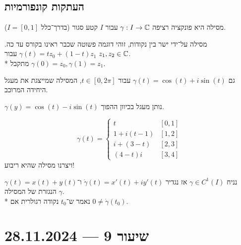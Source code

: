 \subsection{העתקות קונפורמיות}
\begin{definition}
	מסילה היא פונקציה רציפה $\gamma : I \to \mathbb{C}$ עבור $I$ קטע סגור (בדרך־כלל $I = [0, 1]$).
\end{definition}
\begin{example}
	מסילה על־ידי ישר בין נקודות, זוהי דוגמה פשוטה שכבר ראינו בקורס עד כה.
	$\gamma(t) = tz_0 + (1 - t)z_1$ עבור $z_1, z_2 \in \mathbb{C}$. \\*
	מתקבל $\gamma(0) = z_0, \gamma(1) = z_1$.
\end{example}
\begin{example}
	גם $\gamma(t) = \cos(t) + i \sin(t)$ עבור $t \in [0, 2\pi]$, המסילה שמייצגת את מעגל היחידה המרוכב.
\end{example}
\begin{example}
	$\gamma(y) = \cos(t) - i \sin(t)$ נותן מעגל בכיוון ההפוך.
\end{example}
\begin{example}
	\[
		\gamma(t) = \begin{cases}
			t & [0, 1] \\
			1 + i(t - 1) & [1, 2] \\
			i + (3 - t) & [2, 3] \\
			(4 - t)i & [3, 4]
		\end{cases}
	\]
	ויצרנו מסילה שהיא ריבוע!
\end{example}
נניח $\gamma \in C^1(I)$ אז נגדיר $\dot{\gamma}(t) = x'(t) + iy'(t)$ ו־$\gamma(t) = x(t) + y(t)$ הנגזרת של המסילה $\gamma$. \\*
נאמר ש־$t_0$ נקודה רגולרית אם $0 \ne \dot{\gamma}(t_0)$.

\section{שיעור 9 --- 28.11.2024}

